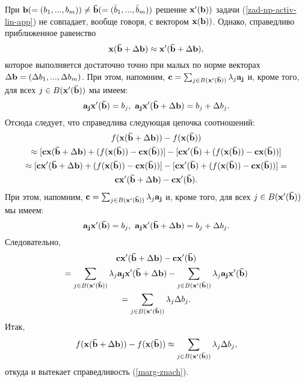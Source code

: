     При $\mathbf{b}(=(b_{1},...,b_{m}))\neq\mathbf{\bar{b}}(=(\bar{b}_{1},...,\bar{b}_{m}))$
    решение $\mathbf{x'}(\mathbf{b}))$ задачи (\ref{zad-np-activ-lin-app}) не совпадает,
    вообще говоря, с вектором $\mathbf{x}(\mathbf{b}))$. Однако, справедливо приближенное равенство
    \[\mathbf{x}(\mathbf{\bar{b}}+\Delta\mathbf{b})\approx\mathbf{x'}(\mathbf{\bar{b}}+\Delta\mathbf{b}),\]
    которое выполняется достаточно точно при малых по норме векторах
    $\Delta\mathbf{b}=(\Delta b_{1},...,\Delta b_{m})$. При этом,
    напомним,
    $\mathbf{c}=\sum_{j\in B(\mathbf{x'}(\mathbf{\bar{b}}))}\lambda_{j}\mathbf{a_{j}}$
    и, кроме того, для всех $j\in B(\mathbf{x'}(\mathbf{\bar{b}}))$ мы
    имеем:
    \[\mathbf{a_{j}}\mathbf{x'}(\mathbf{\bar{b}})=b_{j}, \
    \mathbf{a_{j}}\mathbf{x'}(\mathbf{\bar{b}}+\Delta\mathbf{b})=b_{j}+\Delta b_{j}.\]
    Отсюда следует, что справедлива следующая цепочка соотношений:
\begin{multline*}
    f(\mathbf{x}(\mathbf{\bar{b}}+\Delta\mathbf{b}))-f(\mathbf{x}(\mathbf{\bar{b}}))
\\
    \approx[\mathbf{c}\mathbf{x}(\mathbf{\bar{b}}+\Delta\mathbf{b})
    +(f(\mathbf{x}(\mathbf{\bar{b}}))-\mathbf{c}\mathbf{x}(\mathbf{\bar{b}}))]
    -[\mathbf{c}\mathbf{x'}(\mathbf{\bar{b}})+(f(\mathbf{x}(\mathbf{\bar{b}}))-\mathbf{c}\mathbf{x}(\mathbf{\bar{b}}))]
\\
    \approx[\mathbf{c}\mathbf{x'}(\mathbf{\bar{b}}+\Delta\mathbf{b})
    +(f(\mathbf{x}(\mathbf{\bar{b}}))-\mathbf{c}\mathbf{x}(\mathbf{\bar{b}}))]
    -[\mathbf{c}\mathbf{x'}(\mathbf{\bar{b}})+(f(\mathbf{x}(\mathbf{\bar{b}}))-\mathbf{c}\mathbf{x}(\mathbf{\bar{b}}))]=
\\
    \mathbf{c}\mathbf{x'}(\mathbf{\bar{b}}+\Delta\mathbf{b})-\mathbf{c}\mathbf{x'}(\mathbf{\bar{b}}).
\end{multline*}
    При этом, напомним,
    $\mathbf{c}=\sum_{j\in B(\mathbf{x'}(\mathbf{\bar{b}}))}\lambda_{j}\mathbf{a_{j}}$
    и, кроме того, для всех $j\in B(\mathbf{x'}(\mathbf{\bar{b}}))$ мы
    имеем:
    \[\mathbf{a_{j}}\mathbf{x'}(\mathbf{\bar{b}})=b_{j}, \
    \mathbf{a_{j}}\mathbf{x'}(\mathbf{\bar{b}}+\Delta\mathbf{b})=b_{j}+\Delta b_{j}.\]
    Следовательно,
\begin{multline*}
    \mathbf{c}\mathbf{x'}(\mathbf{\bar{b}}+\Delta\mathbf{b})-\mathbf{c}\mathbf{x'}(\mathbf{\bar{b}})
\\
    =\sum_{j\in B(\mathbf{x'}(\mathbf{\bar{b}}))}\lambda_{j}\mathbf{a_{j}}\mathbf{x'}(\mathbf{\bar{b}}+\Delta\mathbf{b})
    -\sum_{j\in B(\mathbf{x'}(\mathbf{\bar{b}}))}\lambda_{j}\mathbf{a_{j}}\mathbf{x'}(\mathbf{\bar{b}})
\\
    =\sum_{j\in B(\mathbf{x'}(\mathbf{\bar{b}}))}\lambda_{j}\Delta b_{j}.
\end{multline*}
    Итак,
    \[f(\mathbf{x}(\mathbf{\bar{b}}+\Delta\mathbf{b}))-f(\mathbf{x}(\mathbf{\bar{b}}))
    \approx\sum_{j\in B(\mathbf{x'}(\mathbf{\bar{b}}))}\lambda_{j}\Delta b_{j},\]
    откуда и вытекает справедливость (\ref{marg-znach}).



